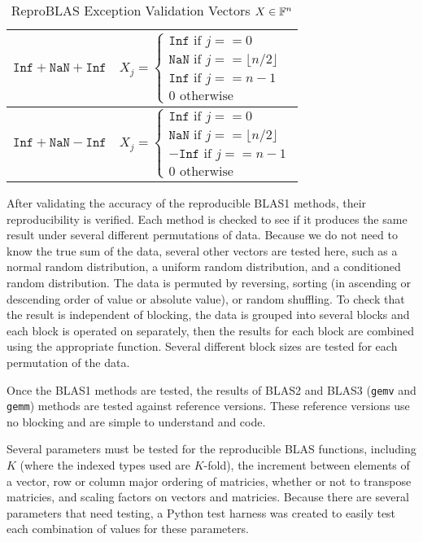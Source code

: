 \begin{table}[!htbp]
\begin{tabular}{ | l |  l |}
            $\texttt{Inf} + \texttt{NaN} + \texttt{Inf}$ & $X_j = \begin{cases} \texttt{Inf} \text{ if } j == 0 \\ \texttt{NaN} \text{ if } j == \lfloor n/2 \rfloor \\ \texttt{Inf} \text{ if } j == n - 1 \\ 0 \text{ otherwise} \end{cases}$\\ \hline
            $\texttt{Inf} + \texttt{NaN} - \texttt{Inf}$ & $X_j = \begin{cases} \texttt{Inf} \text{ if } j == 0 \\ \texttt{NaN} \text{ if } j == \lfloor n/2 \rfloor \\ -\texttt{Inf} \text{ if } j == n - 1 \\ 0 \text{ otherwise} \end{cases}$\\ \hline
        \end{tabular}
        \caption{ReproBLAS Exception Validation Vectors $X \in \mathbb{F}^n$}
        \label{tbl:validateinfblas1data}
    \end{table}

  After validating the accuracy of the reproducible BLAS1 methods, their reproducibility is verified. Each method is checked to see if it produces the same result under several different permutations of data. Because we do not need to know the true sum of the data, several other vectors are tested here, such as a normal random distribution, a uniform random distribution, and a conditioned random distribution. The data is permuted by reversing, sorting (in ascending or descending order of value or absolute value), or random shuffling. To check that the result is independent of blocking, the data is grouped into several blocks and each block is operated on separately, then the results for each block are combined using the appropriate function. Several different block sizes are tested for each permutation of the data.

  Once the BLAS1 methods are tested, the results of BLAS2 and BLAS3 (\texttt{gemv} and \texttt{gemm}) methods are tested against reference versions. These reference versions use no blocking and are simple to understand and code.

  Several parameters must be tested for the reproducible BLAS functions, including $K$ (where the indexed types used are $K$-fold), the increment between elements of a vector, row or column major ordering of matricies, whether or not to transpose matricies, and scaling factors on vectors and matricies. Because there are several parameters that need testing, a Python test harness was created to easily test each combination of values for these parameters.
